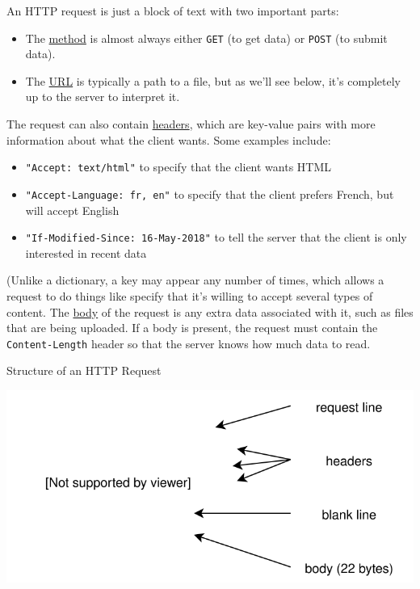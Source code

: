 An HTTP request is just a block of text with two important parts:

\begin{itemize}
\tightlist
\item
  The \protect\hyperlink{g:http-method}{method} is almost always either
  \texttt{GET} (to get data) or \texttt{POST} (to submit data).
\item
  The \protect\hyperlink{g:url}{URL} is typically a path to a file, but
  as we'll see below, it's completely up to the server to interpret it.
\end{itemize}

The request can also contain \protect\hyperlink{g:http-header}{headers},
which are key-value pairs with more information about what the client
wants. Some examples include:

\begin{itemize}
\tightlist
\item
  \texttt{"Accept:\ text/html"} to specify that the client wants HTML
\item
  \texttt{"Accept-Language:\ fr,\ en"} to specify that the client
  prefers French, but will accept English
\item
  \texttt{"If-Modified-Since:\ 16-May-2018"} to tell the server that the
  client is only interested in recent data
\end{itemize}

(Unlike a dictionary, a key may appear any number of times, which allows
a request to do things like specify that it's willing to accept several
types of content. The \protect\hyperlink{g:http-body}{body} of the
request is any extra data associated with it, such as files that are
being uploaded. If a body is present, the request must contain the
\texttt{Content-Length} header so that the server knows how much data to
read.

Structure of an HTTP Request

\includegraphics{../../files/server-request.svg}

